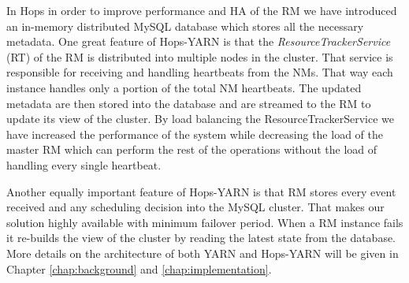 In Hops in order to improve performance and HA of the RM we have introduced an
in-memory distributed MySQL database which stores all the necessary
metadata. One great feature of Hops-YARN is that the
\emph{ResourceTrackerService} (RT) of the RM is distributed into multiple
nodes in the cluster. That service is responsible for receiving and handling
heartbeats from the NMs. That way each instance handles only a portion of the total NM
heartbeats. The updated metadata are then stored into the database and
are streamed to the RM to update its view of the cluster. By load
balancing the ResourceTrackerService we have increased the performance
of the system while decreasing the load of the master RM which can
perform the rest of the operations without the load of handling every
single heartbeat.

Another equally important feature of Hops-YARN is that RM stores
every event received and any scheduling decision into the MySQL
cluster. That makes our solution highly available with minimum
failover period. When a RM instance fails it re-builds the view of the
cluster by reading the latest state from the database. More details on
the architecture of both YARN and Hops-YARN will be given in Chapter
\ref{chap:background} and \ref{chap:implementation}.